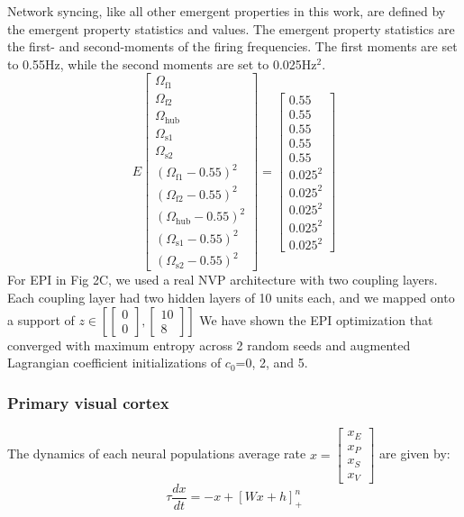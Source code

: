 \documentclass[11pt]{article}
\begin{document}
Network syncing, like all other emergent properties in this work, are defined by the emergent property statistics and values.  The emergent property statistics are the first- and second-moments of the firing frequencies. The first moments are set to 0.55Hz, while the second moments are set to 0.025Hz$^2$.
\begin{equation}
E \begin{bmatrix} \Omega_{\text{f1}} \\ \Omega_{\text{f2}} \\ \Omega_{\text{hub}} \\ \Omega_{\text{s1}} \\ \Omega_{\text{s2}} \\ (\Omega_{\text{f1}} - 0.55)^2 \\ (\Omega_{\text{f2}} - 0.55)^2 \\ (\Omega_{\text{hub}} - 0.55)^2 \\ (\Omega_{\text{s1}} - 0.55)^2 \\ (\Omega_{\text{s2}} - 0.55)^2  \end{bmatrix} = \begin{bmatrix} 0.55 \\ 0.55 \\ 0.55 \\ 0.55 \\ 0.55 \\ 0.025^2 \\ 0.025^2 \\ 0.025^2 \\ 0.025^2 \\ 0.025^2 \end{bmatrix}
\end{equation}
For EPI in Fig 2C, we used a real NVP architecture with two coupling layers.  Each coupling layer had two hidden layers of 10 units each, and we mapped onto a support of $z \in \left[ \begin{bmatrix} 0 \\ 0 \end{bmatrix}, \begin{bmatrix} 10 \\ 8 \end{bmatrix} \right]$  We have shown the EPI optimization that converged with maximum entropy across 2 random seeds and augmented Lagrangian coefficient initializations of $c_0$=0, 2, and 5.

\subsubsection{Primary visual cortex}\label{methods_V1}
The dynamics of each neural populations average rate
$x = \begin{bmatrix} x_E \\ x_P \\ x_S \\ x_V \end{bmatrix}$
are given by:
\begin{equation}
\tau \frac{dx}{dt} = -x + [W x+ h]_+^n
\end{equation}
\end{document}
